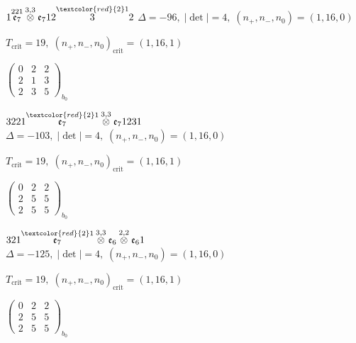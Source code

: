 \documentclass[10pt]{article}
\begin{document}
\smallskip

$1\overset{221}{\mathfrak{e}_7}\overset{3,3}{\otimes}\mathfrak{e}_712\overset{\textcolor{red}{2}1}{3}2$ \quad $\Delta=-96,\; |\det|=4,\; (n_+,n_-,n_0)=(1,16,0)$

\hspace{1em}$T_{\text{crit}}=19,\; (n_+,n_-,n_0)_{\text{crit}}=(1,16,1)$

\hspace{2em}$\left(\begin{smallmatrix}0 & 2 & 2 \\ 2 & 1 & 3 \\ 2 & 3 & 5\end{smallmatrix}\right)_{\!b_0}$

\smallskip

$3221\overset{\textcolor{red}{2}1}{\mathfrak{e}_7}\overset{3,3}{\otimes}\mathfrak{e}_71231$ \quad $\Delta=-103,\; |\det|=4,\; (n_+,n_-,n_0)=(1,16,0)$

\hspace{1em}$T_{\text{crit}}=19,\; (n_+,n_-,n_0)_{\text{crit}}=(1,16,1)$

\hspace{2em}$\left(\begin{smallmatrix}0 & 2 & 2 \\ 2 & 5 & 5 \\ 2 & 5 & 5\end{smallmatrix}\right)_{\!b_0}$

\smallskip

$321\overset{\textcolor{red}{2}1}{\mathfrak{e}_7}\overset{3,3}{\otimes}\mathfrak{e}_6\overset{2,2}{\otimes}\mathfrak{e}_61$ \quad $\Delta=-125,\; |\det|=4,\; (n_+,n_-,n_0)=(1,16,0)$

\hspace{1em}$T_{\text{crit}}=19,\; (n_+,n_-,n_0)_{\text{crit}}=(1,16,1)$

\hspace{2em}$\left(\begin{smallmatrix}0 & 2 & 2 \\ 2 & 5 & 5 \\ 2 & 5 & 5\end{smallmatrix}\right)_{\!b_0}$
\end{document}
